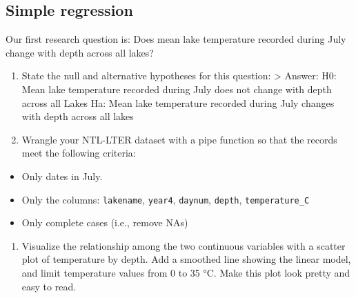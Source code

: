 \documentclass[
]{article}
\providecommand{\tightlist}{%
  \setlength{\itemsep}{0pt}\setlength{\parskip}{0pt}}
\begin{document}
\hypertarget{simple-regression}{%
\subsection{Simple regression}\label{simple-regression}}

Our first research question is: Does mean lake temperature recorded
during July change with depth across all lakes?

\begin{enumerate}
\def\labelenumi{\arabic{enumi}.}
\setcounter{enumi}{2}
\item
  State the null and alternative hypotheses for this question:
  \textgreater{} Answer: H0: Mean lake temperature recorded during July
  does not change with depth across all Lakes Ha: Mean lake temperature
  recorded during July changes with depth across all lakes
\item
  Wrangle your NTL-LTER dataset with a pipe function so that the records
  meet the following criteria:
\end{enumerate}

\begin{itemize}
\tightlist
\item
  Only dates in July.
\item
  Only the columns: \texttt{lakename}, \texttt{year4}, \texttt{daynum},
  \texttt{depth}, \texttt{temperature\_C}
\item
  Only complete cases (i.e., remove NAs)
\end{itemize}

\begin{enumerate}
\def\labelenumi{\arabic{enumi}.}
\setcounter{enumi}{4}
\tightlist
\item
  Visualize the relationship among the two continuous variables with a
  scatter plot of temperature by depth. Add a smoothed line showing the
  linear model, and limit temperature values from 0 to 35 °C. Make this
  plot look pretty and easy to read.
\end{enumerate}
\end{document}

